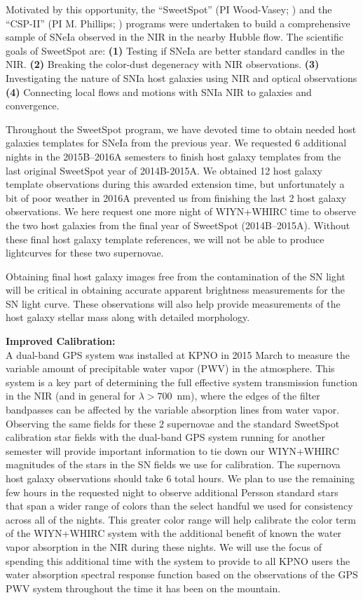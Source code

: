 \documentclass[11pt]{article}
\begin{document}
Motivated by this opportunity, the ``SweetSpot'' (PI Wood-Vasey; \cite{weyant11}) and the ``CSP-II'' (PI M. Phillips; \cite{contreras10,stritzinger11}) programs were undertaken to build a comprehensive sample of SNeIa observed in the NIR in the nearby Hubble flow.
The scientific goals of SweetSpot are:
{\bf (1)}
Testing if SNeIa are better standard candles in the NIR.
{\bf (2)}
Breaking the color-dust degeneracy with NIR observations.
{\bf (3)}
Investigating the nature of SNIa host galaxies using NIR and optical observations
{\bf (4)}
Connecting local flows and motions with SNIa NIR to galaxies and convergence.

Throughout the SweetSpot program, we have devoted time to obtain needed host galaxies templates for SNeIa from the previous year.  
We requested 6 additional nights in the 2015B--2016A semesters to finish host galaxy templates from the last original SweetSpot year of 2014B-2015A.  
We obtained 12 host galaxy template observations during this awarded extension time, but unfortunately a bit of poor weather in 2016A prevented us from finishing the last 2 host galaxy observations.
We here request one more night of WIYN+WHIRC time to observe the two host galaxies from the final year of SweetSpot (2014B--2015A).
Without these final host galaxy template references, we will not be able to produce lightcurves for these two supernovae.

Obtaining final host galaxy images free from the contamination of the SN light will be critical in obtaining accurate apparent brightness measurements for the SN light curve.  These observations will also help provide measurements of the host galaxy stellar mass along with detailed morphology.

{\bf Improved Calibration:}\\
A dual-band GPS system was installed at KPNO in 2015 March to measure the variable amount of precipitable water vapor (PWV) in the atmosphere.  
This system is a key part of determining the full effective system transmission function in the NIR (and in general for $\lambda>700$~nm), where the edges of the filter bandpasses can be affected by the variable absorption lines from water vapor.  
Observing the same fields for these 2 supernovae and the standard SweetSpot calibration star fields with the dual-band GPS system running for another semester will provide important information to tie down our WIYN+WHIRC magnitudes of the stars in the SN fields we use for calibration.  
The supernova host galaxy observations should take 6 total hours.
We plan to use the remaining few hours in the requested night to observe additional Persson standard stars that span a wider range of colors than the select handful we used for consistency across all of the nights.
This greater color range will help calibrate the color term of the WIYN+WHIRC system with the additional benefit of known the water vapor absorption in the NIR during these nights.
We will use the focus of spending this additional time with the system to provide to all KPNO users the water absorption spectral response function based on the observations of the GPS PWV system throughout the time it has been on the mountain.
\end{document}
